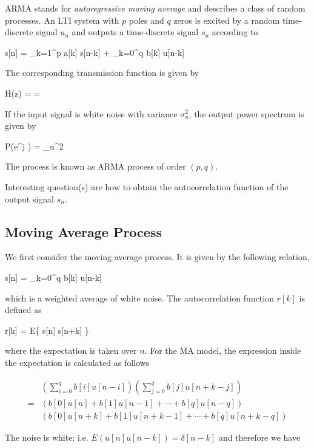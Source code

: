 
ARMA stands for \emph{autoregressive moving average} and describes a class of random processes. An LTI system with $p$ poles and $q$ zeros is excited by a random time-discrete signal $u_n$ and outputs a time-discrete signal $s_n$ according to

\bee
s[n] = \sum_{k=1}^p a[k] s[n-k] + \sum_{k=0}^q b[k] u[n-k]
\eee

The corresponding transmission function is given by

\bee
H(z) =  = 
\eee

If the input signal is white noise with variance $\sigma_u^2$, the output power spectrum is given by

\bee
P(e^{j \omega}) = \sigma_u^2 
\eee

The process is known as ARMA process of order $(p,q)$.


Interesting question(s) are how to obtain the autocorrelation function of the output signal $s_n$.


\subsection{Moving Average Process}

We first consider the moving average process. It is given by the following relation,

\bee
s[n] = \sum_{k=0}^q b[k] u[n-k]
\eee


which is a weighted average of white noise. The autocorrelation function $r[k]$ is defined as 

\bee
r[k] = E\left\{ s[n] s[n+k] \right\}
\eee

where the expectation is taken over $n$. For the MA model, the expression inside the expectation is calculated as follows

\begin{align*}
&\left(\sum_{i=0}^q b[i] u[n-i] \right) \left( \sum_{j=0}^q b[j] u[n+k-j] \right) \\
= &\left( b[0] u[n] + b[1] u[n-1] + \cdots + b[q] u[n-q] \right) \\
  &\left( b[0] u[n+k] + b[1] u[n+k-1] + \cdots + b[q] u[n+k-q] \right)
\end{align*}

The noise is white; i.e. $E(u[n] u[n-k]) = \delta[n-k]$ and therefore we have

